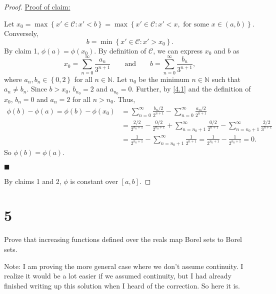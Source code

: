 \documentclass[12pt]{article}
\newenvironment{claimproof}[1]{\par\noindent\underline{Proof of claim:}\space#1}{\hfill $\blacksquare$\vspace{5mm}}
\begin{document}
\begin{proof}
\begin{claimproof}
\begin{description}
Let $x_{0} = \max\left\{ x' \in \mathcal{C} : x' < b \right\} = \max\left\{ x' \in \mathcal{C} : x' < x, \text{ for some }x \in (a,b) \right\}$.
Conversely, 
\begin{equation}
b = \min\left\{ x' \in \mathcal{C} : x' > x_{0} \right\}.
\label{4.1}
\end{equation} 
By claim 1, $\phi(a) = \phi(x_{0})$. By definition of $\mathcal{C}$, we can express $x_{0}$ and $b$ as 
\[ x_{0} = \sum_{n=0}^{\infty}\frac{a_{n}}{3^{n+1}} \qquad \text{and} \qquad b = \sum_{n=0}^{\infty}\frac{b_{n}}{3^{n+1}}, \]
where $a_{n},b_{n} \in \left\{ 0,2 \right\}$ for all $n \in \mathbb{N}$. Let $n_{0}$ be the minimum $n \in \mathbb{N}$ such that $a_{n} \neq b_{n}$.
Since $b > x_{0}$, $b_{n_{0}} = 2$ and $a_{n_{0}} = 0$. Further, by \eqref{4.1} and the definition of $x_{0}$, $b_{n} = 0$ and $a_{n} = 2$ for all $n
> n_{0}$. Thus,
\begin{align*}
\phi(b) - \phi(a) = \phi(b) - \phi(x_{0}) & = \sum_{n=0}^{\infty}\frac{b_{n}/2}{2^{n+1}} - \sum_{n=0}^{\infty}\frac{a_n/2}{2^{n+1}} \\
& = \frac{2/2}{2^{n_{0}+1}} - \frac{0/2}{2^{n_{0}+1}} + \sum_{n=n_{0}+1}^{\infty}\frac{0/2}{2^{n+1}} - \sum_{n=n_0+1}^{\infty}\frac{2/2}{3^{n+1}} \\
& = \frac{1}{2^{n_0+1}} - \sum_{n=n_0+1}^{\infty}\frac{1}{2^{n+1}} = \frac{1}{2^{n_{0}+1}} - \frac{1}{2^{n_{0}+1}} = 0.
\end{align*}
So $\phi(b) = \phi(a)$.
\end{description}
\end{claimproof}

By claims 1 and 2, $\phi$ is constant over $[a,b]$.
\end{proof}


\newpage 
\section*{5}
Prove that increasing functions defined over the reals map Borel sets to Borel sets. 

{\small Note: I am proving the more general case where we don't assume continuity. I realize it would be a lot easier if we assumed continuity, but I had
already finished writing up this solution when I heard of the correction. So here it is.}
\end{document}
